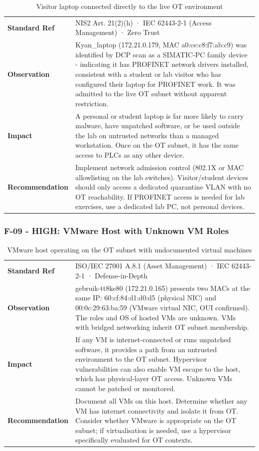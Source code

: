 \begin{table}[H]
\centering
\begin{tabular}{@{}p{}p{}@{}}
\toprule
\textbf{Standard Ref} & NIS2 Art. 21(2)(h) · IEC 62443-2-1 (Access Management) · Zero Trust \\
\textbf{Observation} & Kyan\_laptop (172.21.0.179, MAC a0:ce:c8:f7:ab:c9) was identified by DCP scan as a SIMATIC-PC family device - indicating it has PROFINET network drivers installed, consistent with a student or lab visitor who has configured their laptop for PROFINET work. It was admitted to the live OT subnet without apparent restriction. \\
\textbf{Impact} & A personal or student laptop is far more likely to carry malware, have unpatched software, or be used outside the lab on untrusted networks than a managed workstation. Once on the OT subnet, it has the same access to PLCs as any other device. \\
\textbf{Recommendation} & Implement network admission control (802.1X or MAC allowlisting on the lab switches). Visitor/student devices should only access a dedicated quarantine VLAN with no OT reachability. If PROFINET access is needed for lab exercises, use a dedicated lab PC, not personal devices. \\
\bottomrule
\end{tabular}
\caption{Visitor laptop connected directly to the live OT environment}
\end{table}

\subsubsection{F-09 - HIGH: VMware Host with Unknown VM Roles}

\begin{table}[H]
\centering
\begin{tabular}{@{}p{}p{}@{}}
\toprule
\textbf{Standard Ref} & ISO/IEC 27001 A.8.1 (Asset Management) · IEC 62443-2-1 · Defense-in-Depth \\
\textbf{Observation} & gebruik-tt8ke80 (172.21.0.165) presents two MACs at the same IP: 60:cf:84:d1:d0:d5 (physical NIC) and 00:0c:29:63:ba:59 (VMware virtual NIC, OUI confirmed). The roles and OS of hosted VMs are unknown. VMs with bridged networking inherit OT subnet membership. \\
\textbf{Impact} & If any VM is internet-connected or runs unpatched software, it provides a path from an untrusted environment to the OT subnet. Hypervisor vulnerabilities can also enable VM escape to the host, which has physical-layer OT access. Unknown VMs cannot be patched or monitored. \\
\textbf{Recommendation} & Document all VMs on this host. Determine whether any VM has internet connectivity and isolate it from OT. Consider whether VMware is appropriate on the OT subnet; if virtualisation is needed, use a hypervisor specifically evaluated for OT contexts. \\
\bottomrule
\end{tabular}
\caption{VMware host operating on the OT subnet with undocumented virtual machines}
\end{table}

